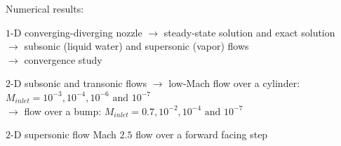 \documentclass[xcolor=dvipsnames,10pt]{beamer}
\newcommand{\resi}{R}
\newcommand{\grad}{\vec{\nabla}}
\begin{document}
\begin{frame}{Numerical results:}
\begin{block}{$1$-D converging-diverging nozzle}
$\longrightarrow$ steady-state solution and exact solution\\
$\longrightarrow$ subsonic (liquid water) and supersonic (vapor) flows\\
$\longrightarrow$ convergence study
\end{block}
\begin{block}{$2$-D subsonic and transonic flows}
$\longrightarrow$ low-Mach flow over a cylinder: $M_{inlet}=10^{-3}, 10^{-4}, 10^{-6} \text{ and } 10^{-7}$ \\
$\longrightarrow$ flow over a bump: $M_{inlet}=0.7, 10^{-2}, 10^{-4} \text{ and } 10^{-7}$
\end{block}
\begin{block}{$2$-D supersonic flow}
Mach $2.5$ flow over a forward facing step
\end{block}
\end{frame}
\end{document}
